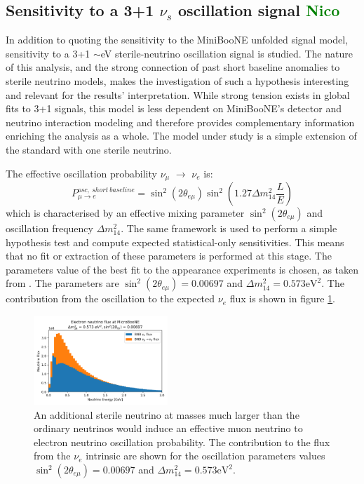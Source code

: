 \documentclass[a4paper]{article}
\newcommand{\nue}{$\nu_e$ }
\newcommand{\numu}{$\nu_{\mu}$ }
\begin{document}
\subsection{Sensitivity to a 3+1 $\nu_s$ oscillation signal \textcolor{green}{Nico}}
In addition to quoting the sensitivity to the MiniBooNE unfolded signal model, sensitivity to a 3+1 $\sim$eV sterile-neutrino oscillation signal is studied. The nature of this analysis, and the strong connection of past short baseline anomalies to sterile neutrino models, makes the investigation of such a hypothesis interesting and relevant for the results' interpretation. While strong tension exists in global fits to 3+1 signals, this model is less dependent on MiniBooNE's detector and neutrino interaction modeling and therefore provides complementary information enriching the analysis as a whole.
The model under study is a simple extension of the standard with one sterile neutrino.
\par The effective oscillation probability \numu $\rightarrow$ \nue is:
\begin{equation}
    P^{osc,~short~baseline}_{\mu \rightarrow e} = \sin^2(2\theta_{e \mu}) \sin^2 \left( 1.27 \Delta m_{14}^2 \frac{L}{E} \right)
\end{equation}
which is characterised by an effective mixing parameter $\sin^2(2\theta_{e \mu})$ and oscillation frequency $\Delta m_{14}^2$.
The same framework is used to perform a simple hypothesis test and compute expected statistical-only sensitivities.
This means that no fit or extraction of these parameters is performed at this stage. 
The parameters value of the best fit to the appearance experiments is chosen, as taken from \cite{bib:oscillation_parameters}.
The parameters are $\sin^2(2\theta_{e \mu}) = 0.00697$ and $\Delta m_{14}^2 = 0.573 \text{eV}^2$.
The contribution from the oscillation to the expected \nue flux is shown in figure \ref{fig:weights_oscillation_prob}.%

\begin{figure}[H]
    \begin{center}
    \includegraphics[width=0.45\textwidth]{Sensitivity/oscillation/osc_plot_deltam2_0573_sin2theta2_000697.png}
    \caption{An additional sterile neutrino at masses much larger than the ordinary neutrinos would induce an effective muon neutrino to electron neutrino oscillation probability.
The contribution to the flux from the \nue intrinsic are shown for the oscillation parameters values $\sin^2(2\theta_{e \mu}) = 0.00697$ and $\Delta m_{14}^2 = 0.573 \text{eV}^2$.}
    \label{fig:weights_oscillation_prob}
    \end{center}
\end{figure}
\end{document}
